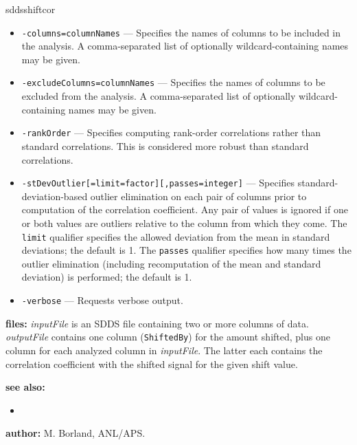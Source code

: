 \begin{sddsprog}{sddsshiftcor}
\begin{itemize}
      \item \verb|-columns=columnNames| --- Specifies the names of columns to be included in the analysis. A comma-separated list of optionally wildcard-containing names may be given.
      \item \verb|-excludeColumns=columnNames| --- Specifies the names of columns to be excluded from the analysis. A comma-separated list of optionally wildcard-containing names may be given.
      \item \verb|-rankOrder| --- Specifies computing rank-order correlations rather than standard correlations. This is considered more robust than standard correlations.
      \item \verb|-stDevOutlier[=limit=factor][,passes=integer]| --- Specifies standard-deviation-based outlier elimination on each pair of columns prior to computation of the correlation coefficient. Any pair of values is ignored if one or both values are outliers relative to the column from which they come. The \verb|limit| qualifier specifies the allowed deviation from the mean in standard deviations; the default is 1. The \verb|passes| qualifier specifies how many times the outlier elimination (including recomputation of the mean and standard deviation) is performed; the default is 1.
      \item \verb|-verbose| --- Requests verbose output.
    \end{itemize}
  \item \textbf{files:} \emph{inputFile} is an SDDS file containing two or more columns of data. \emph{outputFile} contains one column (\verb|ShiftedBy|) for the amount shifted, plus one column for each analyzed column in \emph{inputFile}. The latter each contains the correlation coefficient with the shifted signal for the given shift value.
  \item \textbf{see also:}
    \begin{itemize}
      \item {}
    \end{itemize}
  \item \textbf{author:} M. Borland, ANL/APS.
\end{sddsprog}

